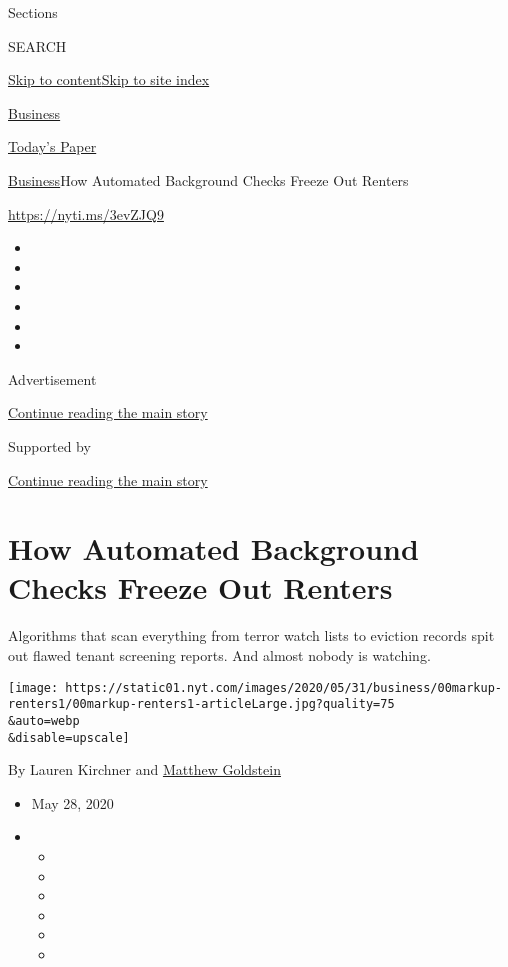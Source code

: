 Sections

SEARCH

\protect\hyperlink{site-content}{Skip to
content}\protect\hyperlink{site-index}{Skip to site index}

\href{https://www.nytimes.com/section/business}{Business}

\href{https://myaccount.nytimes.com/auth/login?response_type=cookie\&client_id=vi}{}

\href{https://www.nytimes.com/section/todayspaper}{Today's Paper}

\href{/section/business}{Business}\textbar{}How Automated Background
Checks Freeze Out Renters

\url{https://nyti.ms/3evZJQ9}

\begin{itemize}
\item
\item
\item
\item
\item
\item
\end{itemize}

Advertisement

\protect\hyperlink{after-top}{Continue reading the main story}

Supported by

\protect\hyperlink{after-sponsor}{Continue reading the main story}

\hypertarget{how-automated-background-checks-freeze-out-renters}{%
\section{How Automated Background Checks Freeze Out
Renters}\label{how-automated-background-checks-freeze-out-renters}}

Algorithms that scan everything from terror watch lists to eviction
records spit out flawed tenant screening reports. And almost nobody is
watching.

\texttt{[image: https://static01.nyt.com/images/2020/05/31/business/00markup-renters1/00markup-renters1-articleLarge.jpg?quality=75\\\&auto=webp\\\&disable=upscale]}

By Lauren Kirchner and
\href{https://www.nytimes.com/by/matthew-goldstein}{Matthew Goldstein}

\begin{itemize}
\item
  May 28, 2020
\item
  \begin{itemize}
  \item
  \item
  \item
  \item
  \item
  \item
  \end{itemize}
\end{itemize}

